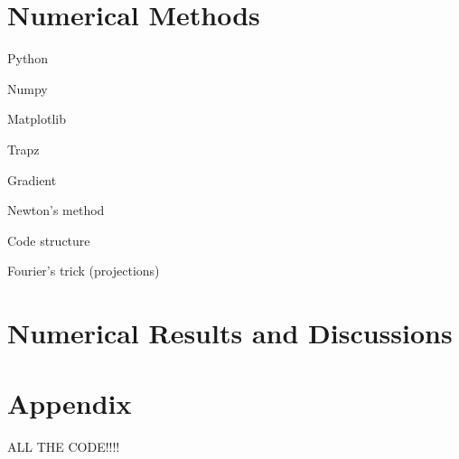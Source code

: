 \documentclass[12pt,a4paper]{article}
\begin{document}
\section{Numerical Methods}
Python

Numpy

Matplotlib

Trapz

Gradient

Newton's method

Code structure

Fourier's trick (projections)

\section{Numerical Results and Discussions}

\section{Appendix}
ALL THE CODE!!!!
\end{document}
